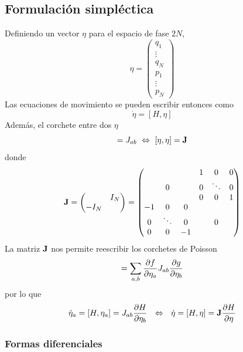 \documentclass[]{article}
\numberwithin{equation}{section}
\begin{document}
\subsection{Formulación simpléctica}
Definiendo un vector $\eta$ para el espacio de fase $2N$,
\begin{equation}
	\eta = \begin{pmatrix}
		q_1\\
		\vdots\\
		q_N\\
		p_1\\
		\vdots\\
		p_N
	\end{pmatrix}
\end{equation}
Las ecuaciones de movimiento se pueden escribir entonces como
\begin{equation}
	\dot{\eta} = [H,\eta]
\end{equation}
Además, el corchete entre dos $\eta$
\begin{equation}
	[\eta_a,\eta_b] = J_{ab} ~\Leftrightarrow~ [\n{\eta},\n{\eta}] = \n{J}
\end{equation}
donde
\begin{equation}
	\mathbf{J} = \begin{pmatrix}
		& I_N\\
		-I_N &
	\end{pmatrix} = \begin{pmatrix}
	&   & & 1 & 0 & 0\\
	& 0 & & 0 & \ddots & 0\\
	&   & & 0 & 0 & 1\\
	-1 & 0      &  0 & &   &\\
	 0 & \ddots &  0 & & 0 &\\
	 0 & 0      & -1 & &   &
	\end{pmatrix}
\end{equation}
La matriz $\mathbf{J}$ nos permite reescribir los corchetes de Poisson
\begin{equation}
	[f,g] = \sum_{a,b} \pd{f}{\eta_a} J_{ab} \pd{g}{\eta_b}
\end{equation}
por lo que
\begin{equation}
	\dot{\eta}_a = [H,\eta_a] = J_{ab}\dfrac{\partial H}{\partial \eta_b} ~~\Leftrightarrow~~ \dot{\mathbf{\eta}} = [H,\mathbf{\eta}] = \mathbf{J}\dfrac{\partial H}{\partial \mathbf{\eta}}
\end{equation}

\subsubsection{Formas diferenciales}
\end{document}
